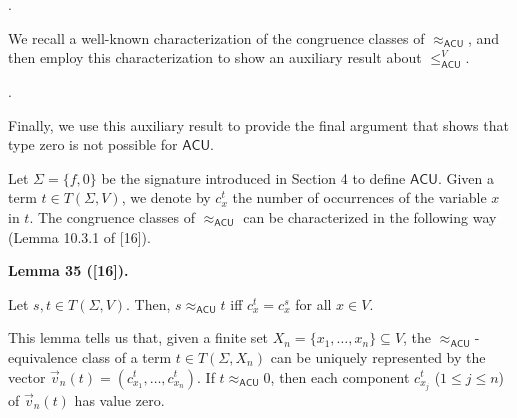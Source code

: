 \documentclass[10pt,a4paper]{amsart}
\begin{document}
\par{}. 
 
We recall a well-known characterization of the congruence classes of $\approx_{\mathsf{ACU}}$, and then employ this characterization to show an auxiliary result about $\leq_{\mathsf{ACU}}^{V}$.\par
 
 
 
\par{}. 
 
Finally, we use this auxiliary result to provide the final argument that shows that type zero is not possible for $\mathsf{ACU}$.\par
 
 
  
 
 
Let $\Sigma=\{f,0\}$ be the signature introduced in Section 4 to define $\mathsf{ACU}$. Given a term $t\in T(\Sigma,V)$, we denote by $c^{t}_{x}$ the number of occurrences of the variable $x$ in $t$. The congruence classes of $\approx_{\mathsf{ACU}}$ can be characterized in the following way (Lemma 10.3.1 of [16]).\par
 
 
 
\par\medskip\noindent\textbf{Lemma 35 ([16]).}\par
 
 
Let $s,t\in T(\Sigma,V)$. Then, $s\approx_{\mathsf{ACU}}t$ iff $c^{t}_{x}=c^{s}_{x}$ for all $x\in V$.\par
 
 
 
 
This lemma tells us that, given a finite set $X_{n}=\{x_{1},\ldots,x_{n}\}\subseteq V$, the $\approx_{\mathsf{ACU}}$-equivalence class of a term $t\in T(\Sigma,X_{n})$ can be uniquely represented by the vector $\vec{v}_{n}(t)=(c^{t}_{x_{1}},\ldots,c^{t}_{x_{n}})$. If $t\approx_{\mathsf{ACU}}0$, then each component $c^{t}_{x_{j}}$ ($1\leq j\leq n$) of $\vec{v}_{n}(t)$ has value zero.\par
 
 
\end{document}
